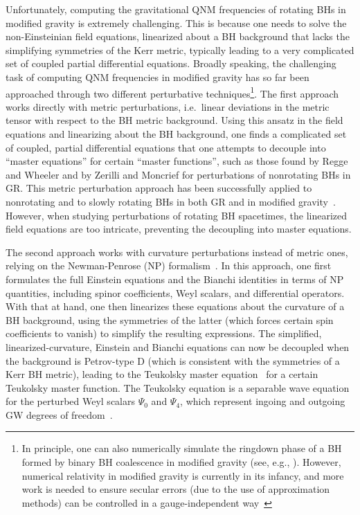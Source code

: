 \documentclass[aps,prx,amsmath,floats,floatfix,twocolumn,
  superscriptaddress,nofootinbib,showpacs]{revtex4-1}
\begin{document}
Unfortunately, computing the gravitational QNM frequencies of rotating BHs in modified gravity is extremely challenging. 
This is because one needs to solve the non-Einsteinian field equations, linearized about a BH background that lacks the simplifying symmetries of the Kerr metric, typically leading to a very complicated set of coupled partial differential equations. 
Broadly speaking, the challenging task of computing QNM frequencies in modified gravity has so far been approached through two different perturbative techniques\footnote{In principle, one can also numerically simulate the ringdown phase of a BH formed by binary BH coalescence in modified gravity (see, e.g., \cite{AresteSalo:2023hcp}). 
However, numerical relativity in modified gravity is currently in its infancy, and more work is needed to ensure secular errors (due to the use of approximation methods) can be controlled in a gauge-independent way~\cite{Okounkova:2019dfo, Kovacs:2020ywu, Cayuso:2023aht}}.
The first approach works directly with metric perturbations, i.e.~linear deviations in the metric tensor with respect to the BH metric background. 
Using this ansatz in the field equations and linearizing about the BH background, one finds a complicated set of coupled, partial differential equations that one attempts to decouple into ``master equations'' for certain ``master functions'', such as those found by Regge and Wheeler \cite{Regge_Wheeler_gauge} and by Zerilli and Moncrief \cite{Zerilli_even, Moncrief:1974am} for perturbations of nonrotating BHs in GR. 
This metric perturbation approach has been successfully applied to nonrotating and to slowly rotating BHs in both GR and in modified gravity~\cite{Regge:PhysRev.108.1063,Zerilli:1971wd,Moncrief:1974am,Molina:2010fb,Cardoso:2009pk,Blazquez-Salcedo:2016enn,Wagle:2021tam,Pierini:2021jxd,Pierini:2022eim,Cano:2020cao,DeFelice:2023rra}. 
However, when studying perturbations of rotating BH spacetimes, the linearized field equations are too intricate, preventing the decoupling into master equations. 

The second approach works with curvature perturbations instead of metric ones,  relying on the Newman-Penrose (NP) formalism~\cite{Newman:1961qr}. 
In this approach, one first formulates the full Einstein equations and the Bianchi identities in terms of NP quantities, including spinor coefficients, Weyl scalars, and differential operators. 
With that at hand, one then linearizes these equations about the curvature of a BH background, using the symmetries of the latter (which forces certain spin coefficients to vanish) to simplify the resulting expressions. 
The simplified, linearized-curvature, Einstein and Bianchi equations can now be decoupled when the background is Petrov-type D (which is consistent with the symmetries of a Kerr BH metric), leading to the Teukolsky master equation~\cite{Teukolsky:1973ha} for a certain Teukolsky master function. 
The Teukolsky equation is a separable wave equation for the perturbed Weyl scalars $\Psi_0$ and $\Psi_4$, which represent ingoing and outgoing GW degrees of freedom~\cite{Teukolsky_01_PRL, Teukolsky:1973ha, Press:1973zz, Teukolsky:1974yv}.
\end{document}
